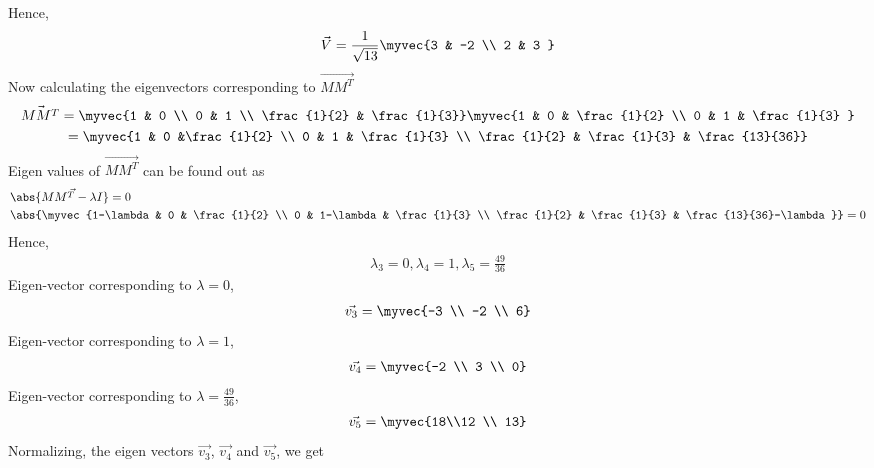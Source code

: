 \documentclass[journal,12pt,twocolumn]{IEEEtran}
\begin{document}
Hence,
\begin{align}
	\vec{V} = \frac{1}{\sqrt{13}}\myvec{3 & -2 \\ 2 & 3 } \label{5}
\end{align}
Now calculating the eigenvectors corresponding to $\vec{MM^T}$
\begin{multline}
\vec{MM^T} = \myvec{1 & 0 \\ 0 & 1 \\ \frac{1}{2} & \frac{1}{3}}\myvec{1 & 0 & \frac{1}{2} \\ 0 & 1 & \frac{1}{3} } \\ =
\myvec{1 & 0 &\frac{1}{2} \\ 0 & 1 & \frac{1}{3} \\  \frac{1}{2} & \frac{1}{3} & \frac{13}{36}}
\end{multline}
Eigen values of $\vec{MM^T}$ can be found out as
\begin{align}
	& \abs{\vec{MM^T-\lambda I}} = 0 \\
	& \abs{\myvec{1-\lambda & 0 & \frac{1}{2} \\ 0 & 1-\lambda & \frac{1}{3} \\ \frac{1}{2} & \frac{1}{3} & \frac{13}{36}-\lambda}} = 0 \\
\end{align}
Hence,
\begin{align}
\lambda_3 = 0, \lambda_4 = 1, \lambda_5=\frac{49}{36}
\end{align}
Eigen-vector corresponding to $\lambda=0$,
\begin{align}
	\vec{v_3} = \myvec{-3 \\ -2 \\ 6}
\end{align}
Eigen-vector corresponding to $\lambda=1$,
\begin{align}
	\vec{v_4} = \myvec{-2 \\ 3 \\ 0}
\end{align}
Eigen-vector corresponding to $\lambda=\frac{49}{36}$,
\begin{align}
	\vec{v_5} = \myvec{18\\12 \\ 13}
\end{align}
Normalizing, the eigen vectors $\vec{v_3}$, $\vec{v_4}$ and $\vec{v_5}$, we get
\end{document}
